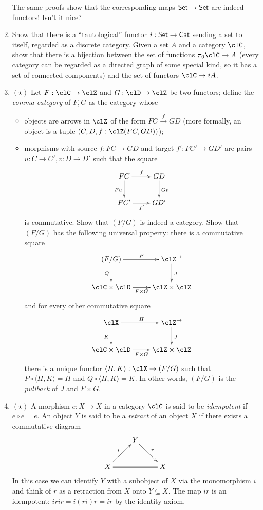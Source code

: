 \documentclass[11pt]{article}
\begin{document}
\begin{enumerate}
	The same proofs show that the corresponding maps $\mathsf{Set} \to \mathsf{Set}$ are indeed functors! Isn't it nice?
	\item Show that there is a ``tautological'' functor $i : \mathsf{Set} \to \sf Cat$ sending a set to itself, regarded as a discrete category. Given a set $A$ and a category $\clC$, show that there is a bijection between the set of functions $\pi_0\clC \to A$ (every category can be regarded as a directed graph of some special kind, so it has a set of connected components) and the set of functors $\clC \to iA$.
	\item $(\star)$ Let $F : \clC\to\clZ$ and $G :\clD\to\clZ$ be two functors; define the \emph{comma category} of $F,G$ as the category whose
	\begin{itemize}
		\item objects are arrows in $\clZ$ of the form $FC \xrightarrow{f} GD$ (more formally, an object is a tuple $(C,D, f:\clZ(FC,GD))$);
		\item morphisms with source $f :FC \to GD$ and target $f' : FC'\to GD'$ are pairs $u:C\to C', v:D\to D'$ such that the square 
		\[\vcenter{\xymatrix{
			FC \ar[r]^f \ar[d]_{Fu}& GD \ar[d]^{Gv}\\
			FC'\ar[r]_{f'} & GD'
		}}\] is commutative. Show that $(F/G)$ is indeed a category. Show that $(F/G)$ has the following universal property: there is a commutative square 
		\[\vcenter{\xymatrix{
			(F/G) \ar[r]^P\ar[d]_Q &  \clZ^\to \ar[d]^J \\
			\clC\times\clD \ar[r]_{F\times G} & \clZ\times \clZ
		}}\]
		and for every other commutative square 
		\[\vcenter{\xymatrix{
			\clX \ar[r]^H\ar[d]_K &  \clZ^\to \ar[d]^J \\
			\clC\times\clD \ar[r]_{F\times G} & \clZ\times \clZ
		}}\]
		there is a unique functor $\langle H,K\rangle : \clX \to (F/G)$ such that $P\circ \langle H,K\rangle = H$ and $Q\circ \langle H,K\rangle = K$. In other words, $(F/G)$ is the \emph{pullback} of $J$ and $F\times G$.
	\end{itemize}
	\item $(\star)$ A morphism $e : X \to X$ in a category $\clC$ is said to be \emph{idempotent} if $e\circ e=e$. An object $Y$ is said to be a \emph{retract} of an object $X$ if there exists a commutative diagram
	\[
	\xymatrix{
		&Y\ar[dr]^r & \\
		X \ar@{=}[rr]\ar[ur]^i&& X
	}	
	\]
	In this case we can identify $Y$ with a subobject of $X$ via the monomorphism $i$ and think of $r$ as a retraction from $X$ onto $Y \subseteq X$. The map $ir$ is an idempotent: $irir=i(ri)r=ir$ by the identity axiom. 

\end{enumerate}
\end{document}
